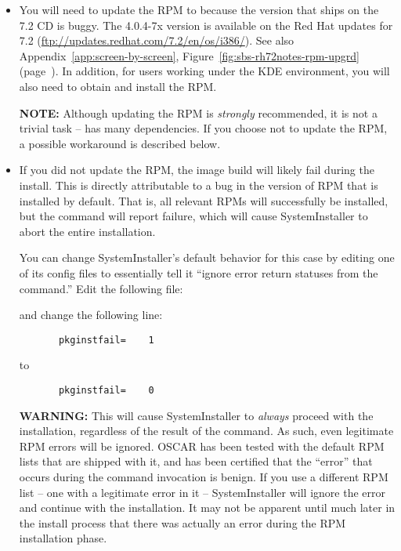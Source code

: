 \begin{itemize}
\item You will need to update the  RPM to
   because the version that ships on the 7.2 CD is
  buggy.  The 4.0.4-7x version is available on the Red Hat updates for
  7.2 (\url{ftp://updates.redhat.com/7.2/en/os/i386/}).  See also
  Appendix~\ref{app:screen-by-screen},
  Figure~\ref{fig:sbs-rh72notes-rpm-upgrd}
  (page~\pageref{fig:sbs-rh72notes-rpm-upgrd}). In addition, for users
  working under the KDE environment, you will also need to obtain and
  install the  RPM.
  
  {\bf NOTE:} Although updating the  RPM is {\em
    strongly} recommended, it is not a trivial task -- 
  has many dependencies.  If you choose not to update the
   RPM, a possible workaround is described below.
  
\item If you did not update the  RPM, the image build
  will likely fail during the install.  This is directly attributable
  to a bug in the version of RPM that is installed by default.  That
  is, all relevant RPMs will successfully be installed, but the
   command will report failure, which will cause
  SystemInstaller to abort the entire installation.  

  You can change SystemInstaller's default behavior for this case by
  editing one of its config files to essentially tell it ``ignore
  error return statuses from the  command.''  Edit the
  following file:

  \vspace{11pt}
  \centerline{}
  \vspace{11pt}

  and change the following line:

\begin{verbatim}
       pkginstfail=    1
\end{verbatim}
  to
\begin{verbatim}
       pkginstfail=    0
\end{verbatim}
  
  {\bf WARNING:} This will cause SystemInstaller to {\em always}
  proceed with the installation, regardless of the result of the
   command.  As such, even legitimate RPM errors will be
  ignored.  OSCAR has been tested with the default RPM lists that are
  shipped with it, and has been certified that the ``error'' that
  occurs during the  command invocation is benign.  If you
  use a different RPM list -- one with a legitimate error in it --
  SystemInstaller will ignore the error and continue with the
  installation.  It may not be apparent until much later in the
  install process that there was actually an error during the RPM
  installation phase.
\end{itemize}

